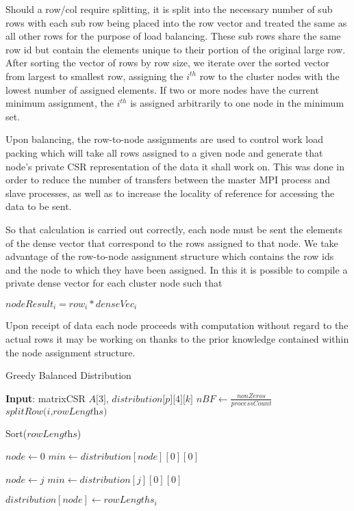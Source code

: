 Should a row/col require splitting, it is split into the necessary number of sub rows with each sub row being placed into the row vector and treated the same as all other rows for the purpose of load balancing. These sub rows share the same row id but contain the elements unique to their portion of the original large row. After sorting the vector of rows by row size, we iterate over the sorted vector from largest to smallest row, assigning the $i^{th}$ row to the cluster nodes with the lowest number of assigned elements. If two or more nodes have the current minimum assignment, the $i^{th}$ is assigned arbitrarily to one node in the minimum set. 

Upon balancing, the row-to-node assignments are used to control work load packing which will take all rows assigned to a given node and generate that node's private CSR representation of the data it shall work on. This was done in order to reduce the number of transfers between the master MPI process and slave processes, as well as to increase the locality of reference for accessing the data to be sent. 

So that calculation is carried out correctly, each node must be sent the elements of the dense vector that correspond to the rows assigned to that node. We take advantage of the row-to-node assignment structure which contains the row ids and the node to which they have been assigned. In this it is possible to compile a private dense vector for each cluster node such that 

\medskip
\begin{center}
	$nodeResult_i = row_i * denseVec_i$
\end{center}
\medskip

Upon receipt of data each node proceeds with computation without regard to the actual rows it may be working on thanks to the prior knowledge contained within the node assignment structure. 

\begin{algorithm}
	\caption{Greedy Balanced Distribution}\label{euclid}
	\begin{algorithmic}[1]
		\State \textbf{Input}: matrixCSR $\textit{A[3]}$, $\textit{distribution[p][4][k]}$
		\medskip
		\State $nBF \gets \frac{nonZeros}{processCount}$
				\State $\textit{splitRow(i,rowLengths)}$
			\EndIf
		\EndFor
		
		\State Sort($\textit{rowLengths}$)
		
			\State $node \gets 0$
			\State $min \gets distribution[node][0][0]$
			
			\medskip
					\State $node \gets j$
					\State $min \gets distribution[j][0][0]$
				\EndIf
			\EndFor
			
			\State $distribution[node] \gets rowLengths_i$
		\EndFor
		\EndProcedure
	\end{algorithmic}
\end{algorithm}
